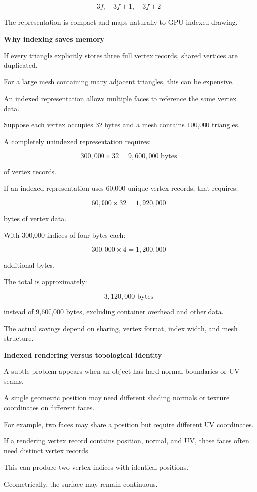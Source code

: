 \[
3f,\quad3f+1,\quad3f+2
\]

The representation is compact and maps naturally to GPU indexed drawing.

\textbf{Why indexing saves memory}

If every triangle explicitly stores three full vertex records, shared vertices are duplicated.

For a large mesh containing many adjacent triangles, this can be expensive.

An indexed representation allows multiple faces to reference the same vertex data.

Suppose each vertex occupies 32 bytes and a mesh contains 100,000 triangles.

A completely unindexed representation requires:

\[
300,000\times32=9,600,000\text{ bytes}
\]

of vertex records.

If an indexed representation uses 60,000 unique vertex records, that requires:

\[
60,000\times32=1,920,000
\]

bytes of vertex data.

With 300,000 indices of four bytes each:

\[
300,000\times4=1,200,000
\]

additional bytes.

The total is approximately:

\[
3,120,000\text{ bytes}
\]

instead of 9,600,000 bytes, excluding container overhead and other data.

The actual savings depend on sharing, vertex format, index width, and mesh structure.

\textbf{Indexed rendering versus topological identity}

A subtle problem appears when an object has hard normal boundaries or UV seams.

A single geometric position may need different shading normals or texture coordinates on different faces.

For example, two faces may share a position but require different UV coordinates.

If a rendering vertex record contains position, normal, and UV, those faces often need distinct vertex records.

This can produce two vertex indices with identical positions.

Geometrically, the surface may remain continuous.

